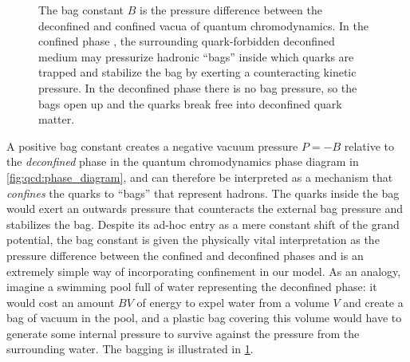 \begin{figure}
{
}
\caption{\label{fig:mit:bag_constant}%
	The bag constant $B$ is the pressure difference between the deconfined and confined vacua of quantum chromodynamics.
	In the confined phase ,
	the surrounding quark-forbidden deconfined medium may pressurize hadronic ``bags''
	inside which quarks are trapped and stabilize the bag by exerting a counteracting kinetic pressure.
	In the deconfined phase  there is no bag pressure,
	so the bags open up and the quarks break free into deconfined quark matter.
}
\end{figure}

A positive bag constant creates a negative vacuum pressure $P = -B$ relative to the \emph{deconfined} phase in the quantum chromodynamics phase diagram in \cref{fig:qcd:phase_diagram},
and can therefore be interpreted as a mechanism that \emph{confines} the quarks to ``bags'' that represent hadrons.
The quarks inside the bag would exert an outwards pressure that counteracts the external bag pressure and stabilizes the bag.
Despite its ad-hoc entry as a mere constant shift of the grand potential,
the bag constant is given the physically vital interpretation as the pressure difference between the confined and deconfined phases
and is an extremely simple way of incorporating confinement in our model.
As an analogy, imagine a swimming pool full of water representing the deconfined phase:
it would cost an amount $BV$ of energy to expel water from a volume $V$ and create a bag of vacuum in the pool,
and a plastic bag covering this volume would have to generate some internal pressure to survive against the pressure from the surrounding water.
The bagging is illustrated in \cref{fig:mit:bag_constant}.

